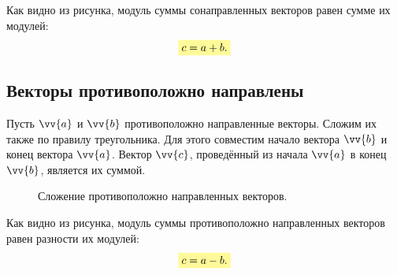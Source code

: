 Как видно из рисунка, модуль суммы сонаправленных векторов равен сумме их модулей:
{\large
  \begin{align}
    \hly{c = a + b.}
  \end{align}
}

\clearpage

\subsection{Векторы противоположно направлены}
Пусть $\vv{a}$ и $\vv{b}$ \bdash противоположно направленные векторы.
Сложим их также по правилу треугольника.
Для этого совместим начало вектора $\vv{b}$ и конец вектора $\vv{a}$. Вектор $\vv{c}$,
проведённый из начала $\vv{a}$ в конец $\vv{b}$, является их суммой.

\begin{figure}[h!]
  \centering
  \hspace{1.4cm}
  \caption{\small Сложение противоположно направленных векторов.}\label{pic:sum2}
\end{figure}

Как видно из рисунка, модуль суммы противоположно направленных векторов
равен разности их модулей:
{\large
  \begin{align}
    \hly{c = a - b.}
  \end{align}
}
